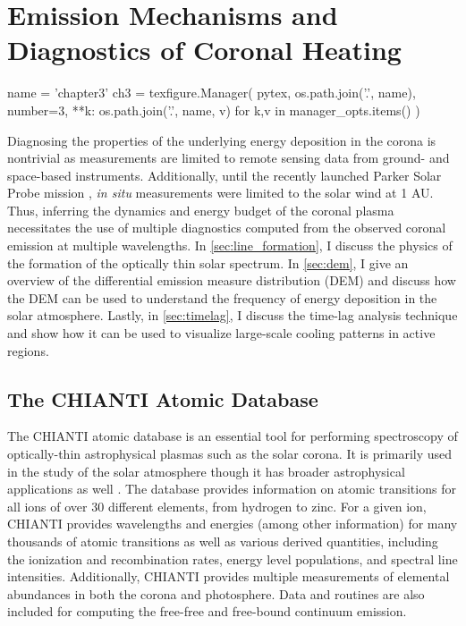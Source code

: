 \chapter{Emission Mechanisms and Diagnostics of Coronal Heating}\label{ch:diagnostics}

\begin{pycode}[chapter3]
name = 'chapter3'
ch3 = texfigure.Manager(
    pytex,
    os.path.join('.', name),
    number=3,
    **{k: os.path.join('.', name, v) for k,v in manager_opts.items()}
)
\end{pycode}

Diagnosing the properties of the underlying energy deposition in the corona is nontrivial as measurements are limited to remote sensing data from ground- and space-based instruments. Additionally, until the recently launched Parker Solar Probe mission \citep{fox_solar_2016}, \textit{in situ} measurements were limited to the solar wind at 1 AU. Thus, inferring the dynamics and energy budget of the coronal plasma necessitates the use of multiple diagnostics computed from the observed coronal emission at multiple wavelengths. In \autoref{sec:line_formation}, I discuss the physics of the formation of the optically thin solar spectrum. In \autoref{sec:dem}, I give an overview of the differential emission measure distribution (DEM) and discuss how the DEM can be used to understand the frequency of energy deposition in the solar atmosphere. Lastly, in \autoref{sec:timelag}, I discuss the time-lag analysis technique and show how it can be used to visualize large-scale cooling patterns in active regions.

\section{The CHIANTI Atomic Database}\label{subsec:chianti}

The CHIANTI atomic database \citep{dere_chianti_1997,young_chianti_1998,landi_chianti_1999,dere_chianti-atomic_2001,landi_chianti-atomic_2002,young_chianti-atomic_2003,landi_chianti-atomic_2006,landi_chianti-atomic_2006-1,dere_chianti_2009,landi_chiantiatomic_2009,young_chiantiatomic_2009,landi_chiantiatomic_2012,landi_chiantiatomic_2013,del_zanna_chianti_2015,young_chianti_2016} is an essential tool for performing spectroscopy of optically-thin astrophysical plasmas such as the solar corona. It is primarily used in the study of the solar atmosphere though it has broader astrophysical applications as well \citep[see Figure 4 of][]{young_chianti_2016}. The database provides information on atomic transitions for all ions of over 30 different elements, from hydrogen to zinc. For a given ion, CHIANTI provides wavelengths and energies (among other information) for many thousands of atomic transitions as well as various derived quantities, including the ionization and recombination rates, energy level populations, and spectral line intensities. Additionally, CHIANTI provides multiple measurements of elemental abundances in both the corona and photosphere. Data and routines are also included for computing the free-free and free-bound continuum emission. 

